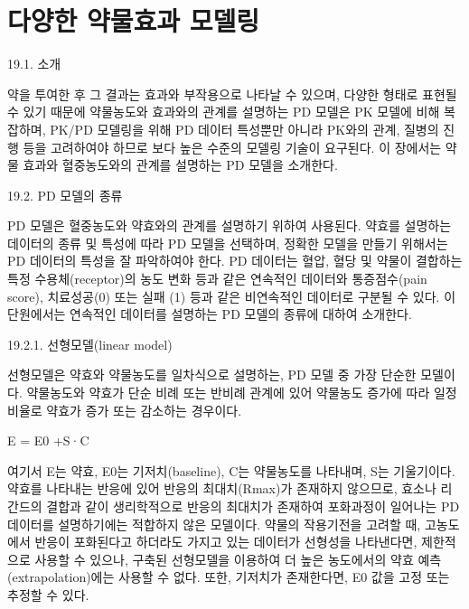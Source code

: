 \documentclass[
  10pt,
]{krantz}
\renewenvironment{quote}{\begin{VF}}{\end{VF}}
\begin{document}
\hypertarget{uxb2e4uxc591uxd55c-uxc57duxbb3cuxd6a8uxacfc-uxbaa8uxb378uxb9c1}{%
\chapter{다양한 약물효과 모델링}\label{uxb2e4uxc591uxd55c-uxc57duxbb3cuxd6a8uxacfc-uxbaa8uxb378uxb9c1}}

19.1. 소개

약을 투여한 후 그 결과는 효과와 부작용으로 나타날 수 있으며, 다양한 형태로 표현될 수 있기 때문에 약물농도와 효과와의 관계를
설명하는 PD 모델은 PK 모델에 비해 복잡하며, PK/PD 모델링을 위해 PD 데이터 특성뿐만 아니라 PK와의 관계, 질병의
진행 등을 고려하여야 하므로 보다 높은 수준의 모델링 기술이 요구된다. 이 장에서는 약물 효과와 혈중농도와의 관계를 설명하는 PD
모델을 소개한다.

19.2. PD 모델의 종류

PD 모델은 혈중농도와 약효와의 관계를 설명하기 위하여 사용된다. 약효를 설명하는 데이터의 종류 및 특성에 따라 PD 모델을
선택하며, 정확한 모델을 만들기 위해서는 PD 데이터의 특성을 잘 파악하여야 한다. PD 데이터는 혈압, 혈당 및
약물이 결합하는 특정 수용체(receptor)의 농도 변화 등과 같은 연속적인 데이터와 통증점수(pain score),
치료성공(0) 또는 실패 (1) 등과 같은 비연속적인 데이터로 구분될 수 있다. 이 단원에서는 연속적인 데이터를 설명하는 PD
모델의 종류에 대하여 소개한다.

\begin{quote}
19.2.1. 선형모델(linear model)
\end{quote}

선형모델은 약효와 약물농도를 일차식으로 설명하는, PD 모델 중 가장 단순한 모델이다. 약물농도와 약효가 단순 비례 또는 반비례
관계에 있어 약물농도 증가에 따라 일정 비율로 약효가 증가 또는 감소하는 경우이다.

E = E0 +S·C

여기서 E는 약효, E0는 기저치(baseline), C는 약물농도를 나타내며, S는 기울기이다. 약효를
나타내는 반응에 있어 반응의 최대치(Rmax)가 존재하지 않으므로, 효소나 리간드의 결합과 같이
생리학적으로 반응의 최대치가 존재하여 포화과정이 일어나는 PD 데이터를 설명하기에는 적합하지 않은 모델이다. 약물의
작용기전을 고려할 때, 고농도에서 반응이 포화된다고 하더라도 가지고 있는 데이터가 선형성을 나타낸다면, 제한적으로
사용할 수 있으나, 구축된 선형모델을 이용하여 더 높은 농도에서의 약효 예측(extrapolation)에는 사용할 수 없다.
또한, 기저치가 존재한다면, E0 값을 고정 또는 추정할 수 있다.
\end{document}

